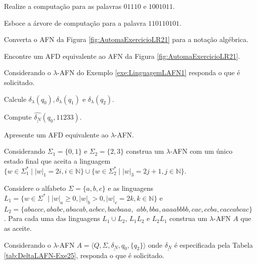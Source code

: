 \begin{exerList}
	\item Realize a computação para as palavras $01110$ e $1001011$.
	\item Esboce a árvore de computação para a palavra $110110101$.
	\item Converta o AFN da Figura \ref{fig:AutomaExercicioLR21} para a notação algébrica.
	\item Encontre um AFD equivalente ao AFN da Figura \ref{fig:AutomaExercicioLR21}.
\end{exerList}

\begin{problem}\label{prob:Regulares15}
	Considerando o $\lambda$-AFN do Exemplo \ref{exe:LinguagemLAFN1} responda o que é solicitado. 
\end{problem}

\begin{exerList}
	\item Calcule $\delta_\lambda(q_0), \delta_\lambda(q_1)$ e $\delta_\lambda(q_2)$.
	\item Compute $\widehat{\underline{\delta_N}}(q_0, 11233)$.
	\item Apresente um AFD equivalente ao $\lambda$-AFN.
\end{exerList}

\begin{problem}\label{prob:Regulares16}
	Considerando $\Sigma_1 = \{0, 1\}$  e $\Sigma_2 = \{2, 3\}$ construa um $\lambda$-AFN com um único estado final que aceita a linguagem $\{w \in \Sigma_1^* \mid |w|_1 = 2i, i \in \mathbb{N}\} \cup \{w \in \Sigma_2^* \mid |w|_3 = 2j + 1, j\in \mathbb{N}\}$.
\end{problem}

\begin{problem}\label{prob:Regulares17}
	Considere o alfabeto $\Sigma = \{a, b, c\}$ e as linguagens  $L_1 = \{w \in \Sigma^* \mid |w|_a \geq 0, |w|_b > 0, |w|_c = 2k, k \in \mathbb{N}\}$ e $L_2 = \{abaccc, ababc, abacab, acbcc, bacbaaa,$ $abb, bba, aaaabbbb, cac, ccba, caccabcac\}$. Para cada uma das linguagens $L_1 \cup L_2$, $L_1L_2$ e $L_2L_1$ construa um $\lambda$-AFN $A$ que as aceite.
\end{problem}

\begin{problem}\label{prob:Regulares18}
	Considerando o $\lambda$-AFN $A = \langle Q, \Sigma, \underline{\delta_N}, q_0, \{q_2\} \rangle$ onde $\underline{\delta_N}$ é especificada pela Tabela \ref{tab:DeltaLAFN-Exe25}, responda o que é solicitado.
\end{problem}

